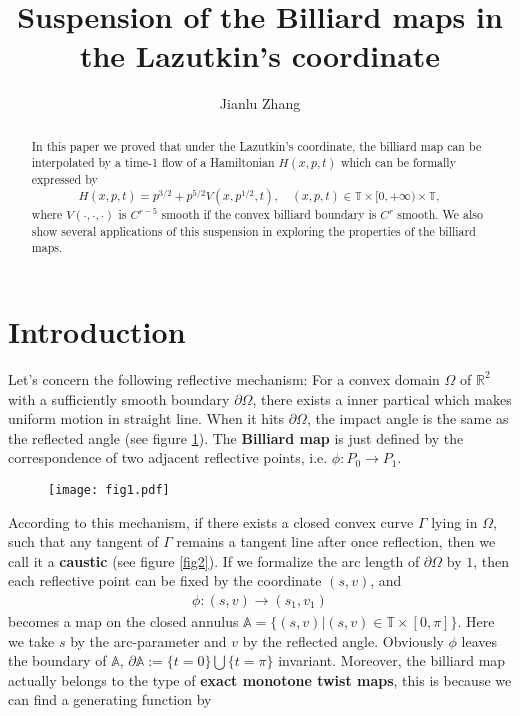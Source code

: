 \documentclass{amsart}
\title{Suspension of the Billiard maps in the Lazutkin's coordinate}
\author{Jianlu Zhang}
\date{}
\begin{document}
\maketitle
\begin{abstract}
In this paper we proved that under the Lazutkin's coordinate, the billiard map can be interpolated by a time-1 flow of a Hamiltonian $H(x,p,t)$ which can be formally expressed by
\[
H(x,p,t)=p^{3/2}+p^{5/2}V(x,p^{1/2},t),\quad(x,p,t)\in{\mathbb{T}}\times[0,+\infty)\times{\mathbb{T}},
\]
where $V(\cdot,\cdot,\cdot)$ is $C^{r-5}$ smooth if the convex billiard boundary is $C^r$ smooth. We also show several applications of this suspension in exploring the properties of the billiard maps.
\end{abstract}

\section{Introduction}
Let's concern the following reflective mechanism: For a convex domain $\Omega$ of ${\mathbb{R}}^2$ with a sufficiently smooth boundary $\partial\Omega$, there exists a inner partical which makes uniform motion in straight line. When it hits $\partial\Omega$, the impact angle is the same as the reflected angle (see figure \ref{fig1}). The {\bf Billiard map} is just defined by the correspondence of two adjacent reflective points, i.e. $\phi:P_0\rightarrow P_1$.
\begin{figure}
\begin{center}
\texttt{[image: fig1.pdf]}
\caption{ }
\label{fig1}
\end{center}
\end{figure}
According to this mechanism, if there exists a closed convex curve $\Gamma$ lying in $\Omega$, such that any tangent of $\Gamma$ remains a tangent line after once reflection, then we call it a {\bf caustic} (see figure \ref{fig2}). If we formalize the arc length of $\partial\Omega$ by $1$, then each reflective point can be fixed by the coordinate $(s,v)$, and
\begin{eqnarray}
\phi:(s,v)\rightarrow(s_1,v_1)
\end{eqnarray}
becomes a map on the closed annulus $\mathbb{A}=\{(s,v)|(s,v)\in{\mathbb{T}}\times[0,\pi]\}$. Here we take $s$ by the arc-parameter and $v$ by the reflected angle. Obviously $\phi$ leaves the boundary of $\mathbb{A}$, $\partial\mathbb{A}:= \{t = 0\} \bigcup\{t = \pi\}$ invariant. Moreover, the billiard map actually belongs to the type of {\bf exact monotone twist maps}, this is because we can find a generating function by 
\end{document}
